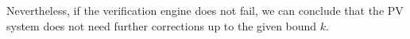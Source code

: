 Nevertheless, if the verification engine does not fail, we can conclude that the PV system does not need further corrections up to the given bound $k$.
%
